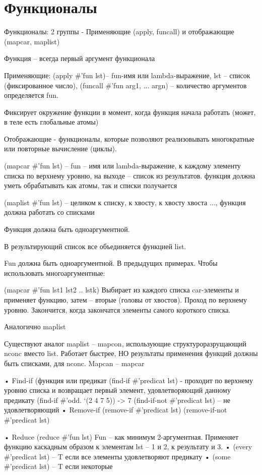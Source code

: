 \documentclass{article}
\begin{document}
\section*{Функционалы}
Функционалы: 2 группы - Применяющие (apply,  funcall) и отображающие (mapcar, maplist)

Функция – всегда первый аргумент функционала



Применяющие: (apply \#'fun lst)--  fun-имя или lambda-выражение, lst -- список (фиксированное число), (funcall \#'fun arg1, ... argn) -- количество аргументов определяется fun.

Фиксирует окружение функции в момент, когда функция начала работать (может, в теле есть глобальные атомы)


Отображающие -  функционалы, которые позволяют реализовывать многократные или повторные вычисление (циклы).

(mapcar \#'fun lst) -- fun -- имя или lambda-выражение, к каждому элементу списка по верхнему уровню, на выходе -- список из результатов. функция должна уметь обрабатывать как атомы, так и списки получается

(maplist \#'fun lst) -- целиком к списку, к хвосту, к хвосту хвоста ..., функция должна работать со списками

Функция должна быть одноаргументной.

В результирующий список все объединяется функцией list. 

Fun должна быть одноаргументной. В предыдущих примерах. Чтобы использовать многоаргументные:

(mapcar \#’fun lst1 lst2 .. lstk)
Выбирает из каждого списка car-элементы и применяет функцию, затем – вторые (головы от хвостов). Проход по верхнему уровню. Закончится, когда закончатся элементы самого короткого списка. 

Аналогично maplist

Существуют аналог maplist -- mapcon, использующие структуроразрущающий nconc вместо list. Работает быстрее, НО результаты применения функций должны быть списками, для nconc. Mapcan -- mapcar


•	Find-if (функция или предикат
(find-if  \#’predicat lst) - проходит по верхнему уровню списка и возвращает первый элемент, удовлетворяющий данному предикату
(find-if \#’odd. ‘(2 4 7 5)) -> 7
(find-if-not \#’predicat lst) – не удовлетворяющий
•	Remove-if
(remove-if \#’predicat lst)
(remove-if-not \#’predicat lst)


•	Reduce
(reduce \#’fun lst)
Fun – как минимум 2-аргументная. Применяет функцию каскадным образом к элементам lst – 1 и 2, к результату и 3.
•	(every \#’predicat lst) – T если все элементы удовлетворяют предикату
•	(some \#’predicat lst) – T если некоторые
\end{document}

